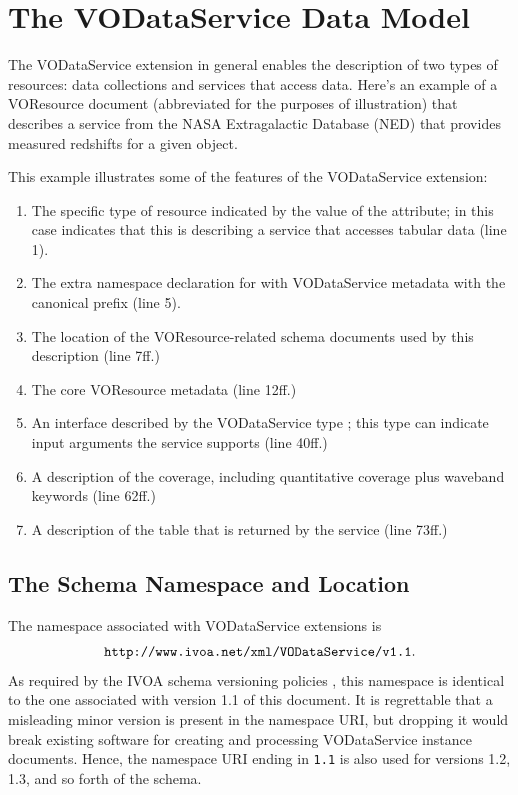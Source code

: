 \documentclass[11pt,a4paper]{ivoa}
\begin{document}
\section{The VODataService Data Model}


The VODataService extension in general enables the description of two
types of resources:  data collections and services that access data.
Here's an example of a VOResource document (abbreviated for the
purposes of illustration) that describes a service from the NASA
Extragalactic Database (NED) that provides measured redshifts for a
given object.




This example illustrates some of the features of the VODataService
extension:

\begin{enumerate}
\item The specific type of resource indicated by
       the value of the  attribute; in this case
        indicates that this is
       describing a service that accesses tabular data (line 1).
\item The extra namespace declaration for with
       VODataService metadata with the canonical prefix (line 5).
\item The location of the VOResource-related schema 
       documents used by this description (line 7ff.)
\item The core VOResource metadata (line 12ff.)
\item An interface described by the
       VODataService type ; this
       type can indicate input arguments the service supports (line
       40ff.)
\item A description of the
       coverage, including quantitative coverage
       plus waveband keywords (line 62ff.)
\item A description of the table that is returned
       by the service (line 73ff.)
\end{enumerate}

\subsection{The Schema Namespace and Location}


The namespace associated with VODataService extensions is
$$\mbox{\texttt{http://www.ivoa.net/xml/VODataService/v1.1}}.$$
As required by the IVOA schema versioning policies
\citep{2018ivoa.spec.0529H}, this namespace is identical to the one
associated with version 1.1 of this document.  It is regrettable that a
misleading minor version is present in the namespace URI, but dropping
it would break existing software for creating and processing
VODataService instance documents.  Hence, the namespace URI ending in
\verb|1.1| is also used for versions 1.2, 1.3, and so forth of the
schema.
\end{document}
